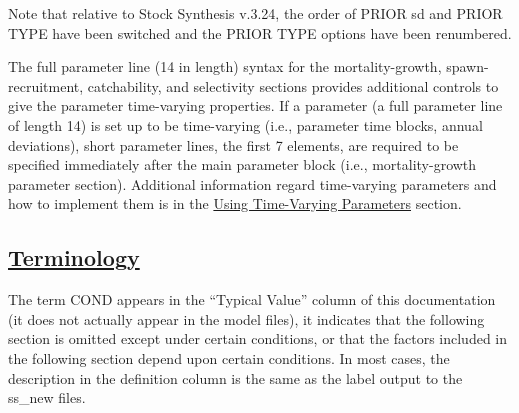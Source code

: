 Note that relative to Stock Synthesis v.3.24, the order of PRIOR \gls{sd} and PRIOR TYPE have been switched and the PRIOR TYPE options have been renumbered.

The full parameter line (14 in length) syntax for the mortality-growth, spawn-recruitment, catchability, and selectivity sections provides additional controls to give the parameter time-varying properties. If a parameter (a full parameter line of length 14) is set up to be time-varying (i.e., parameter time blocks, annual deviations), short parameter lines, the first 7 elements, are required to be specified immediately after the main parameter block (i.e., mortality-growth parameter section). Additional information regard time-varying parameters and how to implement them is in the \hyperlink{TVpara}{Using Time-Varying Parameters} section.

\hypertarget{ControlTerminology}{}
\subsection[Terminology]{\protect\hyperlink{ControlTerminology}{Terminology}}
The term COND appears in the ``Typical Value'' column of this documentation (it does not actually appear in the model files), it indicates that the following section is omitted except under certain conditions, or that the factors included in the following section depend upon certain conditions. In most cases, the description in the definition column is the same as the label output to the ss\_new files.

\hypertarget{ControlInputs}{}
